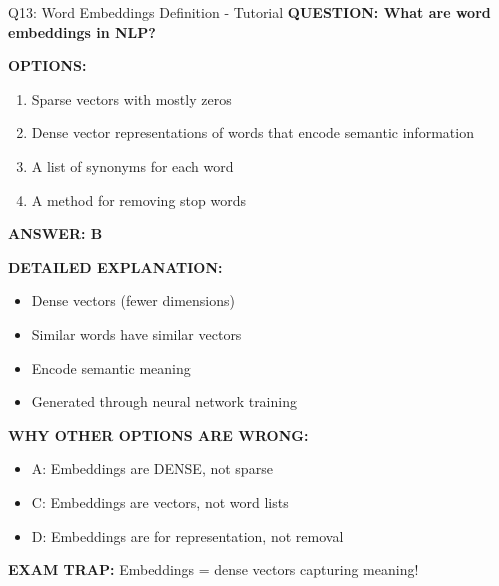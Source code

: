 \documentclass[8pt]{beamer}
\begin{document}
	\begin{frame}{Q13: Word Embeddings Definition - Tutorial}
		\fontsize{6.5}{7.5}\selectfont
		\textbf{QUESTION: What are word embeddings in NLP?}
		
		\vspace{0.1cm}
		\textbf{OPTIONS:}
		\begin{enumerate}
			\item Sparse vectors with mostly zeros
			\item Dense vector representations of words that encode semantic information
			\item A list of synonyms for each word
			\item A method for removing stop words
		\end{enumerate}
		
		\vspace{0.1cm}
		\textcolor{myblue}{\textbf{ANSWER: B}}
		
		\vspace{0.1cm}
		\textbf{DETAILED EXPLANATION:}
		\begin{itemize}
			\item Dense vectors (fewer dimensions)
			\item Similar words have similar vectors
			\item Encode semantic meaning
			\item Generated through neural network training
		\end{itemize}
		
		\vspace{0.1cm}
		\textcolor{myred}{\textbf{WHY OTHER OPTIONS ARE WRONG:}}
		\begin{itemize}
			\item \textcolor{myred}{A:} Embeddings are DENSE, not sparse
			\item \textcolor{myred}{C:} Embeddings are vectors, not word lists
			\item \textcolor{myred}{D:} Embeddings are for representation, not removal
		\end{itemize}
		
		\textcolor{myred}{\textbf{EXAM TRAP:}} Embeddings = \textcolor{myblue}{dense vectors capturing meaning}!
	\end{frame}
	
\end{document}
